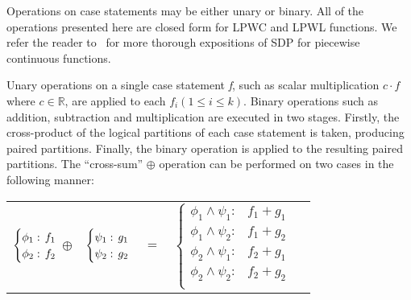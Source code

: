 Operations on case statements may be either unary or binary. All of the operations presented here are closed form for LPWC and LPWL functions. We refer the reader to~\parencite{Sanner_UAI_2011,Zamani_AAAI_2012} for more thorough expositions of SDP for piecewise continuous functions.

Unary operations on a single case statement \emph{f}, such as scalar multiplication {\footnotesize$c \cdot f$} where {\footnotesize$ c \in \mathbb{R} $}, are applied to  each {\footnotesize$f_i \left(1 \leq i \leq k\right)$}. Binary operations such as addition, subtraction and multiplication are executed in two stages. Firstly, the cross-product of the logical partitions of each case statement is taken, producing paired partitions. Finally, the binary operation is applied to the resulting paired partitions. The ``cross-sum'' {\footnotesize$\oplus$} operation can be performed on two cases in the following manner:
{\footnotesize 
    \begin{center}
        \begin{tabular}{r c c c l}
            $\begin{cases}
            \phi_1: \hspace{-1mm} & \hspace{-1mm} f_1  \\ 
            \phi_2: \hspace{-1mm} & \hspace{-1mm} f_2  \\ 
            \end{cases}$
            $\oplus$
            &
            \hspace{-4mm}
            $\begin{cases}
            \psi_1: \hspace{-1mm} & \hspace{-1mm} g_1  \\ 
            \psi_2: \hspace{-1mm} & \hspace{-1mm} g_2  \\ 
            \end{cases}$
            &
            \hspace{-4mm} 
            $ = $
            &
            \hspace{-4mm}
            $\begin{cases}
            \phi_1 \wedge \psi_1: & f_1 + g_1 \\
            \phi_1 \wedge \psi_2: & f_1 + g_2 \\
            \phi_2 \wedge \psi_1: & f_2 + g_1 \\
            \phi_2 \wedge \psi_2: & f_2 + g_2  \\
            \end{cases}$
        \end{tabular}
    \end{center}
}%

